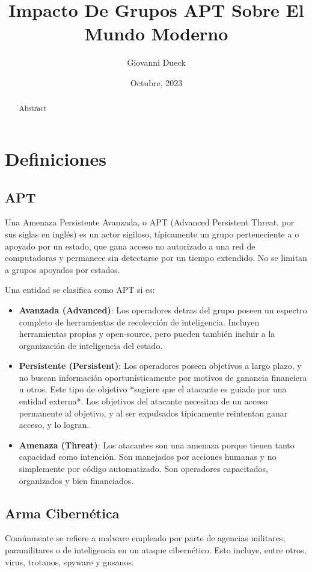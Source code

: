 \documentclass{article}
\title{Impacto De Grupos APT Sobre El Mundo Moderno}
\author{Giovanni Dueck}
\date{Octubre, 2023}
\begin{document}
\maketitle

\begin{abstract}
    Abstract
\end{abstract}

\section{Definiciones}
\subsection{APT}
Una Amenaza Persistente Avanzada, o APT (Advanced Persistent Threat, por sus siglas en inglés) es un actor sigiloso, típicamente un grupo perteneciente a o apoyado por un estado, que gana acceso no autorizado a una red de computadoras y permanece sin detectarse por un tiempo extendido. No se limitan a grupos apoyados por estados. \autocite{cybereason-apt} 

Una entidad se clasifica como APT si es:
\begin{itemize}
    \item {\bf Avanzada (Advanced)}: Los operadores detras del grupo poseen un espectro completo de herramientas de recolección de inteligencia. Incluyen herramientas propias y open-source, pero pueden también incluir a la organización de inteligencia del estado.
    \item {\bf Persistente (Persistent)}: Los operadores poseen objetivos a largo plazo, y no buscan información oportunísticamente por motivos de ganancia financiera u otros. Este tipo de objetivo *sugiere que el atacante es guiado por una entidad externa*. Los objetivos del atacante necesitan de un acceso permanente al objetivo, y al ser expulsados típicamente reintentan ganar acceso, y lo logran.
    \item {\bf Amenaza (Threat)}: Los atacantes son una amenaza porque tienen tanto capacidad como intención. Son manejados por acciones humanas y no simplemente por código automatizado. Son operadores capacitados, organizados y bien financiados. \autocite{itgov-apt}
\end{itemize}

\subsection{Arma Cibernética}
Comúnmente se refiere a malware empleado por parte de agencias militares, paramilitares o de inteligencia en un ataque cibernético. Esto incluye, entre otros, virus, trotanos, spyware y gusanos.
\end{document}
